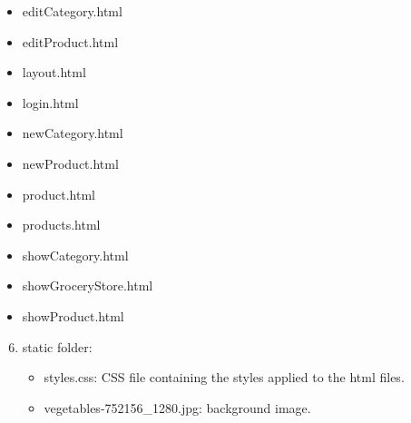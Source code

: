 \documentclass[letterpaper,10pt,english]{sphinxmanual}
\begin{document}
\begin{enumerate}
\begin{itemize}
\item {} 
editCategory.html

\item {} 
editProduct.html

\item {} 
layout.html

\item {} 
login.html

\item {} 
newCategory.html

\item {} 
newProduct.html

\item {} 
product.html

\item {} 
products.html

\item {} 
showCategory.html

\item {} 
showGroceryStore.html

\item {} 
showProduct.html

\end{itemize}

\end{enumerate}

\begin{DUlineblock}{0em}
\item[] 
\end{DUlineblock}
\begin{enumerate}
\setcounter{enumi}{5}
\item {} 
static folder:
\begin{itemize}
\item {} 
styles.css: CSS file containing the styles applied to the html files.

\item {} 
vegetables-752156\_1280.jpg: background image.

\end{itemize}

\end{enumerate}
\end{document}
